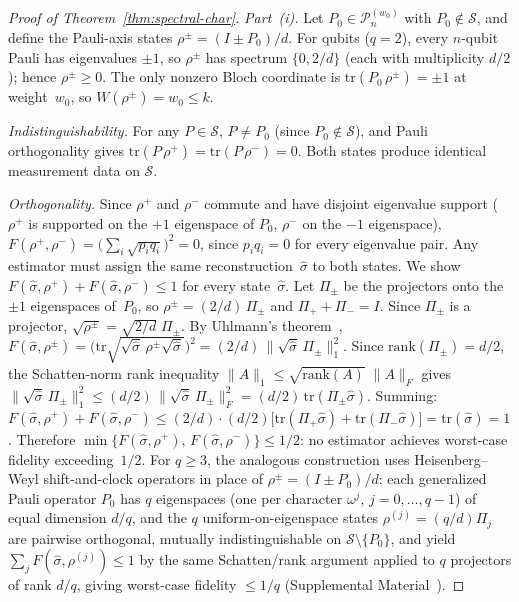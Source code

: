 \documentclass[twocolumn,prx,aps,superscriptaddress,longbibliography,floatfix]{revtex4-2}
\begin{document}
\begin{proof}[Proof of Theorem~\ref{thm:spectral-char}]
\emph{Part~(i).}
Let $P_0 \in \mathcal{P}_n^{(w_0)}$ with $P_0 \notin
\mathcal{S}$, and define the Pauli-axis states
$\rho^\pm = (I \pm P_0)/d$.
For qubits ($q = 2$), every $n$-qubit Pauli has
eigenvalues $\pm 1$, so
$\rho^\pm$ has spectrum $\{0, 2/d\}$ (each with multiplicity
$d/2$); hence $\rho^\pm \ge 0$.  The only nonzero Bloch
coordinate is $\mathrm{tr}(P_0\,\rho^\pm) = \pm 1$ at
weight~$w_0$, so $W(\rho^\pm) = w_0 \le k$.

\emph{Indistinguishability.}
For any $P \in \mathcal{S}$, $P \neq P_0$ (since
$P_0 \notin \mathcal{S}$), and Pauli orthogonality gives
$\mathrm{tr}(P\,\rho^+) = \mathrm{tr}(P\,\rho^-) = 0$.
Both states produce identical measurement data on
$\mathcal{S}$.

\emph{Orthogonality.}
Since $\rho^+$ and $\rho^-$ commute and have disjoint
eigenvalue support ($\rho^+$ is supported on the $+1$
eigenspace of $P_0$, $\rho^-$ on the $-1$ eigenspace),
$F(\rho^+, \rho^-)
= \bigl(\sum_i \sqrt{p_i q_i}\bigr)^2 = 0$,
since $p_i q_i = 0$ for every eigenvalue pair.
Any estimator must assign the same reconstruction~$\hat\sigma$
to both states.  We show
$F(\hat\sigma,\rho^+) + F(\hat\sigma,\rho^-) \le 1$
for every state~$\hat\sigma$.
Let $\Pi_\pm$ be the projectors onto the $\pm 1$
eigenspaces of~$P_0$, so $\rho^\pm = (2/d)\,\Pi_\pm$
and $\Pi_+ + \Pi_- = I$.
Since $\Pi_\pm$ is a projector,
$\sqrt{\rho^\pm} = \sqrt{2/d}\;\Pi_\pm$.
By Uhlmann's theorem~\cite{Uhlmann1976},
$F(\hat\sigma,\rho^\pm)
= \bigl(\mathrm{tr}\sqrt{\sqrt{\hat\sigma}\,\rho^\pm
\sqrt{\hat\sigma}}\bigr)^2
= (2/d)\,\|\sqrt{\hat\sigma}\,\Pi_\pm\|_1^2$.
Since $\mathrm{rank}(\Pi_\pm) = d/2$, the Schatten-norm
rank inequality
$\|A\|_1 \le \sqrt{\mathrm{rank}(A)}\;\|A\|_F$ gives
$\|\sqrt{\hat\sigma}\,\Pi_\pm\|_1^2
\le (d/2)\,\|\sqrt{\hat\sigma}\,\Pi_\pm\|_F^2
= (d/2)\,\mathrm{tr}(\Pi_\pm\hat\sigma)$.
Summing:
$F(\hat\sigma,\rho^+) + F(\hat\sigma,\rho^-)
\le (2/d)\cdot(d/2)\bigl[\mathrm{tr}(\Pi_+\hat\sigma)
+ \mathrm{tr}(\Pi_-\hat\sigma)\bigr]
= \mathrm{tr}(\hat\sigma) = 1$.
Therefore $\min\{F(\hat\sigma,\rho^+),\,
F(\hat\sigma,\rho^-)\} \le 1/2$: no estimator achieves
worst-case fidelity exceeding~$1/2$.
For $q \ge 3$, the analogous construction uses
Heisenberg--Weyl shift-and-clock operators in place of
$\rho^\pm = (I \pm P_0)/d$: each generalized Pauli operator
$P_0$ has $q$ eigenspaces (one per character $\omega^j$,
$j = 0,\ldots,q-1$) of equal dimension $d/q$, and the
$q$ uniform-on-eigenspace states $\rho^{(j)} = (q/d)\Pi_j$
are pairwise orthogonal, mutually indistinguishable on
$\mathcal{S} \setminus \{P_0\}$, and yield
$\sum_j F(\hat\sigma, \rho^{(j)}) \le 1$ by the same
Schatten/rank argument applied to $q$ projectors of rank
$d/q$, giving worst-case fidelity $\le 1/q$
(Supplemental Material~\cite{supplemental}).


\end{proof}
\end{document}
